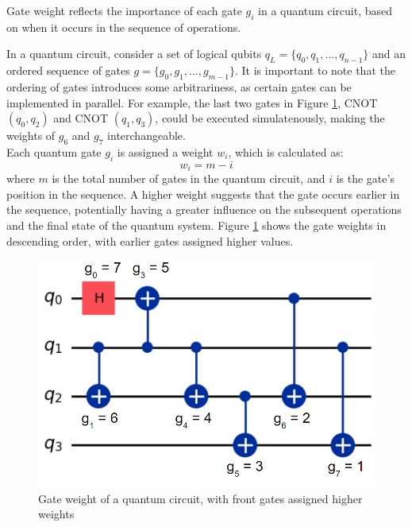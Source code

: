 \begin{definition} %
    Gate weight reflects the importance of each gate $g_i$ in a quantum circuit, based on when it occurs in the sequence of operations.
\end{definition}
In a quantum circuit, consider a set of logical qubits $q_L = \{q_0, q_1, ..., q_{n-1}\}$ and an ordered sequence of gates $g = \{g_0, g_1, ..., g_{m-1}\}$. It is important to note that the ordering of gates introduces some arbitrariness, as certain gates can be implemented in parallel. For example, the last two gates in Figure \ref{fig:gate-weight}, CNOT $(q_0, q_2)$ and CNOT $(q_1, q_3)$, could be executed simulatenously, making the weights of $g_6$ and $g_7$ interchangeable. \\
Each quantum gate $g_i$ is assigned a weight $w_i$, which is calculated as:
\begin{equation}
    w_i = m - i
\end{equation}
where $m$ is the total number of gates in the quantum circuit, and $i$ is the gate's position in the sequence. A higher weight suggests that the gate occurs earlier in the sequence, potentially having a greater influence on the subsequent operations and the final state of the quantum system. Figure \ref{fig:gate-weight} shows the gate weights in descending order, with earlier gates assigned higher values.
\begin{figure}[h]
    \centering
    \includegraphics[width=0.4\linewidth]{image/gate_weight.png}
    \caption{Gate weight of a quantum circuit, with front gates assigned higher weights}
    \label{fig:gate-weight}
\end{figure}

